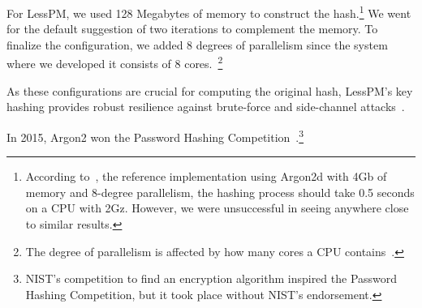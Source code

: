 For LessPM, we used 128 Megabytes of memory to construct the hash.\footnote{
  According to~\cite{argon2specs}, the reference implementation using Argon2d
  with 4Gb of memory and 8-degree parallelism, the hashing process should take
  0.5 seconds on a CPU with 2Gz. However, we were unsuccessful in seeing
  anywhere close to similar results.
}
We went for the default suggestion of two iterations to complement the memory.
To finalize the configuration, we added 8 degrees of parallelism since the
system where we developed it consists of 8 cores.~\footnote{
  The degree of parallelism is affected by how many cores a CPU
  contains~\cite{argon2specs}.
}

As these configurations are crucial for computing the original hash, LessPM's
key hashing provides robust resilience against brute-force and side-channel
attacks~\cite{argon2specs}.

In 2015, Argon2 won the Password Hashing
Competition~\cite{passwordhashing}.\footnote{
  NIST's competition to find an encryption algorithm inspired the Password
  Hashing Competition, but it took place without NIST's endorsement.
}